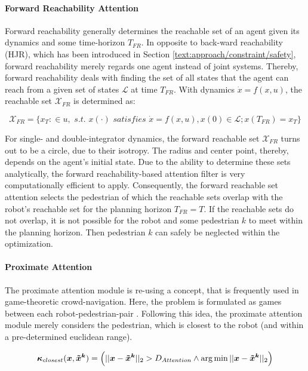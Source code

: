 \paragraph{Forward Reachability Attention}
Forward reachability generally determines the reachable set of an agent given its dynamics and some time-horizon $T_{FR}$. In opposite to back-ward reachability (\ac{HJR}), which has been introduced in Section \ref{text:approach/constraint/safety}, forward reachability merely regards one agent instead of joint systems. Thereby, forward reachability deals with finding the set of all states that the agent can reach from a given set of states $\mathcal{L}$ at time $T_{FR}$. With dynamics $\dot{x} = f(x, u)$, the reachable set $\mathcal{X}_{FR}$ is determined as:

\begin{equation}
\mathcal{X}_{FR} = \{x_T: \in u, \textit{ s.t. } x(\cdot) \textit{ satisfies } \dot{x} = f(x, u), x(0) \in \mathcal{L}; x(T_{FR}) = x_T\}
\end{equation}
 
For single- and double-integrator dynamics, the forward reachable set $\mathcal{X}_{FR}$ turns out to be a circle, due to their isotropy. The radius and center point, thereby, depends on the agent's initial state. Due to the ability to determine these sets analytically, the forward reachability-based attention filter is very computationally efficient to apply.
\newline
Consequently, the forward reachable set attention selects the pedestrian of which the reachable sets overlap with the robot's reachable set for the planning horizon $T_{FR} = T$. If the reachable sets do not overlap, it is not possible for the robot and some pedestrian $k$ to meet within the planning horizon. Then pedestrian $k$ can safely be neglected within the optimization.

\paragraph{Proximate Attention}
The proximate attention module is re-using a concept, that is frequently used in game-theoretic crowd-navigation. Here, the problem is formulated as games between each robot-pedestrian-pair \cite{Bouzat2014}\cite{Nikolaidis2017}. Following this idea, the proximate attention module merely considers the pedestrian, which is closest to the robot (and within a pre-determined euclidean range).

\begin{equation}
\attention_{closest}(\x, \xped[k]) = \left( ||\x - \xped[k]||_2 > D_{Attention} \land \arg \min ||\x - \xped[k]||_2 \right)
\end{equation}

